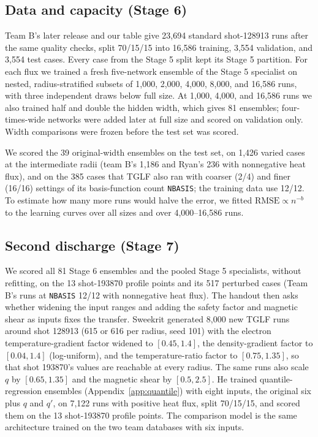 \documentclass[12pt,letterpaper]{article}
\begin{document}
\subsection{Data and capacity (Stage 6)}
\label{sec:meth-data}

Team B's later release and our table give 23,694 standard shot-128913 runs after the same
quality checks, split 70/15/15 into 16,586 training, 3,554 validation, and 3,554 test cases.
Every case from the Stage 5 split kept its Stage 5 partition. For each flux we trained a
fresh five-network ensemble of the Stage 5 specialist on nested, radius-stratified subsets
of 1,000, 2,000, 4,000, 8,000, and 16,586 runs, with three independent draws below full size.
At 1,000, 4,000, and 16,586 runs we also trained half and double the hidden width, which
gives 81 ensembles; four-times-wide networks were added later at full size and scored on
validation only. Width comparisons were frozen before the test set was scored.

We scored the 39 original-width ensembles on the test set, on 1,426 varied cases at the
intermediate radii (team B's 1,186 and Ryan's 236 with nonnegative heat flux), and on the 385
cases that TGLF also ran with coarser (2/4) and finer (16/16) settings of its basis-function
count \texttt{NBASIS}; the training data use 12/12. To estimate how many more runs would
halve the error, we fitted $\text{RMSE} \propto n^{-b}$ to the learning curves over all
sizes and over 4,000--16,586 runs.

\subsection{Second discharge (Stage 7)}
\label{sec:meth-transfer}

We scored all 81 Stage 6 ensembles and the pooled Stage 5 specialists, without refitting,
on the 13 shot-193870 profile points and its 517 perturbed cases (Team B's runs at
\texttt{NBASIS} 12/12 with nonnegative heat flux). The handout then asks whether widening
the input ranges and adding the safety factor and magnetic shear as inputs fixes the
transfer. Sweekrit generated 8,000 new TGLF runs around shot 128913 (615 or 616 per radius,
seed 101) with the electron temperature-gradient factor widened to $[0.45, 1.4]$, the
density-gradient factor to $[0.04, 1.4]$ (log-uniform), and the temperature-ratio factor to
$[0.75, 1.35]$, so that shot 193870's values are reachable at every radius. The same runs
also scale $q$ by $[0.65, 1.35]$ and the magnetic shear by $[0.5, 2.5]$. He trained
quantile-regression ensembles (Appendix~\ref{app:quantile}) with eight inputs, the original
six plus $q$ and $q'$, on 7,122 runs with positive heat flux, split 70/15/15, and scored them
on the 13 shot-193870 profile points. The comparison model is the same architecture trained
on the two team databases with six inputs.
\end{document}
